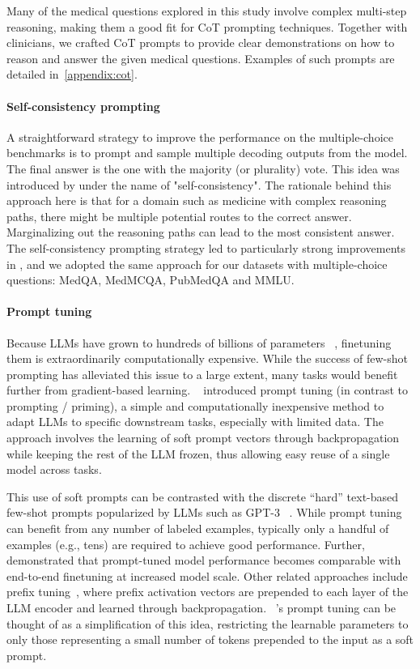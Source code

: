 \documentclass[10pt, letter, onecolumn]{arxiv}
\begin{document}
\begin{refsection}
Many of the medical questions explored in this study involve complex multi-step reasoning, making them a good fit for CoT prompting techniques. Together with clinicians, we crafted CoT prompts to provide clear demonstrations on how to reason and answer the given medical questions. Examples of such prompts are detailed in~\cref{appendix:cot}.

\paragraph{Self-consistency prompting} A straightforward strategy to improve the performance on the multiple-choice benchmarks is to prompt and sample multiple decoding outputs from the model. The final answer is the one with the majority (or plurality) vote. This idea was introduced by \citet{wang2022self} under the name of "self-consistency". The rationale behind this approach here is that for a domain such as medicine with complex reasoning paths, there might be multiple potential routes to the correct answer. Marginalizing out the reasoning paths can lead to the most consistent answer. The self-consistency prompting strategy led to particularly strong improvements in \cite{lewkowycz2022solving}, and we adopted the same approach for our datasets with multiple-choice questions: MedQA, MedMCQA, PubMedQA and MMLU. 



\paragraph{Prompt tuning} Because LLMs have grown to hundreds of billions of parameters ~\cite{brown2020language, chowdhery2022palm}, finetuning them is extraordinarily computationally expensive. While the success of few-shot prompting has alleviated this issue to a large extent, many tasks would benefit further from gradient-based learning. ~\citet{lester2021power} introduced prompt tuning (in contrast to prompting / priming), a simple and computationally inexpensive method to adapt LLMs to specific downstream tasks, especially with limited data. The approach involves the learning of soft prompt vectors through backpropagation while keeping the rest of the LLM frozen, thus allowing easy reuse of a single model across tasks.

This use of soft prompts can be contrasted with the discrete “hard” text-based few-shot prompts popularized by LLMs such as GPT-3 ~\cite{brown2020language}. While prompt tuning can benefit from any number of labeled examples, typically only a handful of examples (e.g., tens) are required to achieve good performance. Further, ~\citet{lester2021power} demonstrated that prompt-tuned model performance becomes comparable with end-to-end finetuning at increased model scale. Other related approaches include prefix tuning~\cite{li2021prefix}, where prefix activation vectors are prepended to each layer of the LLM encoder and learned through backpropagation. ~\citet{lester2021power}’s prompt tuning can be thought of as a simplification of this idea, restricting the learnable parameters to only those representing a small number of tokens prepended to the input as a soft prompt.


\end{refsection}
\end{document}
